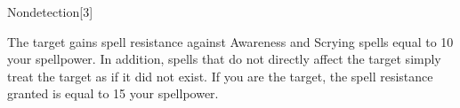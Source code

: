 \begin{spellsection}{Nondetection}[3]
    \begin{spellheader}
    \end{spellheader}
    \begin{spellcontent}
        \begin{spelltargetinginfo}
        \end{spelltargetinginfo}
        \begin{spelleffects}
            \spelleffect The target gains spell resistance against Awareness and Scrying spells equal to 10 \add your spellpower.
            In addition, spells that do not directly affect the target simply treat the target as if it did not exist.
            If you are the target, the spell resistance granted is equal to 15 \add your spellpower.
            \spelldur \durext \dismissable
        \end{spelleffects}
    \end{spellcontent}
    \begin{spellfooter}
    \end{spellfooter}
\end{spellsection}

